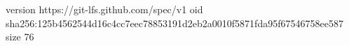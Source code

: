 version https://git-lfs.github.com/spec/v1
oid sha256:125b4562544d16c4cc7eec78853191d2eb2a0010f5871fda95f67546758ee587
size 76
